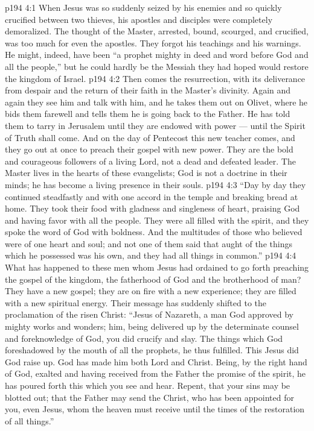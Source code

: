 \vs p194 4:1 When Jesus was so suddenly seized by his enemies and so quickly crucified between two thieves, his apostles and disciples were completely demoralized. The thought of the Master, arrested, bound, scourged, and crucified, was too much for even the apostles. They forgot his teachings and his warnings. He might, indeed, have been “a prophet mighty in deed and word before God and all the people,” but he could hardly be the Messiah they had hoped would restore the kingdom of Israel.
\vs p194 4:2 Then comes the resurrection, with its deliverance from despair and the return of their faith in the Master’s divinity. Again and again they see him and talk with him, and he takes them out on Olivet, where he bids them farewell and tells them he is going back to the Father. He has told them to tarry in Jerusalem until they are endowed with power --- until the Spirit of Truth shall come. And on the day of Pentecost this new teacher comes, and they go out at once to preach their gospel with new power. They are the bold and courageous followers of a living Lord, not a dead and defeated leader. The Master lives in the hearts of these evangelists; God is not a doctrine in their minds; he has become a living presence in their souls.
\vs p194 4:3 “Day by day they continued steadfastly and with one accord in the temple and breaking bread at home. They took their food with gladness and singleness of heart, praising God and having favor with all the people. They were all filled with the spirit, and they spoke the word of God with boldness. And the multitudes of those who believed were of one heart and soul; and not one of them said that aught of the things which he possessed was his own, and they had all things in common.”
\vs p194 4:4 \pc What has happened to these men whom Jesus had ordained to go forth preaching the gospel of the kingdom, the fatherhood of God and the brotherhood of man? They have a new gospel; they are on fire with a new experience; they are filled with a new spiritual energy. Their message has suddenly shifted to the proclamation of the risen Christ: “Jesus of Nazareth, a man God approved by mighty works and wonders; him, being delivered up by the determinate counsel and foreknowledge of God, you did crucify and slay. The things which God foreshadowed by the mouth of all the prophets, he thus fulfilled. This Jesus did God raise up. God has made him both Lord and Christ. Being, by the right hand of God, exalted and having received from the Father the promise of the spirit, he has poured forth this which you see and hear. Repent, that your sins may be blotted out; that the Father may send the Christ, who has been appointed for you, even Jesus, whom the heaven must receive until the times of the restoration of all things.”

